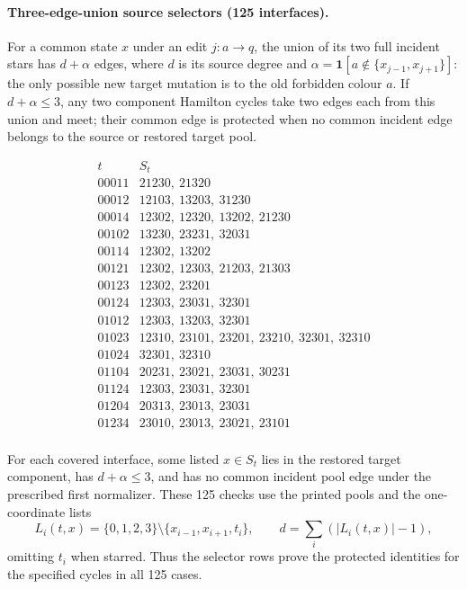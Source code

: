 \paragraph{Three-edge-union source selectors (125 interfaces).}
For a common state $x$ under an edit $j:a\to q$, the union of its
two full incident stars has $d+\alpha$ edges, where $d$ is its source
degree and $\alpha=\mathbf1[a\notin\{x_{j-1},x_{j+1}\}]$:
the only possible new target mutation is to the old forbidden colour $a$.
If $d+\alpha\le3$, any two component Hamilton cycles take two edges
each from this union and meet; their common edge is protected when
no common incident edge belongs to the source or restored target pool.

\[\begin{array}{c|l}t&S_t\\\hline
00011&21230,\ 21320\\
00012&12103,\ 13203,\ 31230\\
00014&12302,\ 12320,\ 13202,\ 21230\\
00102&13230,\ 23231,\ 32031\\
00114&12302,\ 13202\\
00121&12302,\ 12303,\ 21203,\ 21303\\
00123&12302,\ 23201\\
00124&12303,\ 23031,\ 32301\\
01012&12303,\ 13203,\ 32301\\
01023&12310,\ 23101,\ 23201,\ 23210,\ 32301,\ 32310\\
01024&32301,\ 32310\\
01104&20231,\ 23021,\ 23031,\ 30231\\
01124&12303,\ 23031,\ 32301\\
01204&20313,\ 23013,\ 23031\\
01234&23010,\ 23013,\ 23021,\ 23101\\
\end{array}\]

For each covered interface, some listed $x\in S_t$ lies in the restored
target component, has $d+\alpha\le3$, and has no common incident
pool edge under the prescribed first normalizer. These 125 checks use
the printed pools and the one-coordinate lists
\[
L_i(t,x)=\{0,1,2,3\}\setminus\{x_{i-1},x_{i+1},t_i\},\qquad
d=\sum_i(|L_i(t,x)|-1),
\]
omitting $t_i$ when starred. Thus the selector rows prove the protected
identities for the specified cycles in all 125 cases.

